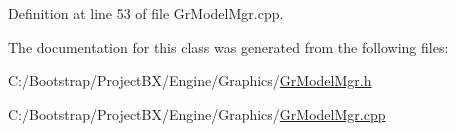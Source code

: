 Definition at line 53 of file GrModelMgr.cpp.

The documentation for this class was generated from the following files:\begin{CompactItemize}
\item 
C:/Bootstrap/ProjectBX/Engine/Graphics/\hyperlink{_gr_model_mgr_8h}{GrModelMgr.h}\item 
C:/Bootstrap/ProjectBX/Engine/Graphics/\hyperlink{_gr_model_mgr_8cpp}{GrModelMgr.cpp}\end{CompactItemize}
